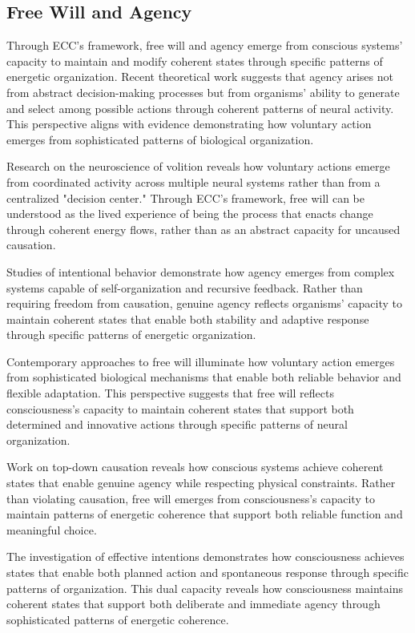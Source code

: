 \begin{refsection}
\section{Free Will and Agency}

Through ECC's framework, free will and agency emerge from conscious systems' capacity to maintain and modify coherent states through specific patterns of energetic organization. Recent theoretical work \cite{Deacon2011} suggests that agency arises not from abstract decision-making processes but from organisms' ability to generate and select among possible actions through coherent patterns of neural activity. This perspective aligns with evidence demonstrating how voluntary action emerges from sophisticated patterns of biological organization.

Research on the neuroscience of volition \cite{Clark2001} reveals how voluntary actions emerge from coordinated activity across multiple neural systems rather than from a centralized "decision center." Through ECC's framework, free will can be understood as the lived experience of being the process that enacts change through coherent energy flows, rather than as an abstract capacity for uncaused causation.

Studies of intentional behavior \cite{Juarrero1999} demonstrate how agency emerges from complex systems capable of self-organization and recursive feedback. Rather than requiring freedom from causation, genuine agency reflects organisms' capacity to maintain coherent states that enable both stability and adaptive response through specific patterns of energetic organization.

Contemporary approaches to free will \cite{Dennett2003} illuminate how voluntary action emerges from sophisticated biological mechanisms that enable both reliable behavior and flexible adaptation. This perspective suggests that free will reflects consciousness's capacity to maintain coherent states that support both determined and innovative actions through specific patterns of neural organization.

Work on top-down causation \cite{Ellis2016} reveals how conscious systems achieve coherent states that enable genuine agency while respecting physical constraints. Rather than violating causation, free will emerges from consciousness's capacity to maintain patterns of energetic coherence that support both reliable function and meaningful choice.

The investigation of effective intentions \cite{Mele2009} demonstrates how consciousness achieves states that enable both planned action and spontaneous response through specific patterns of organization. This dual capacity reveals how consciousness maintains coherent states that support both deliberate and immediate agency through sophisticated patterns of energetic coherence.


\end{refsection}
